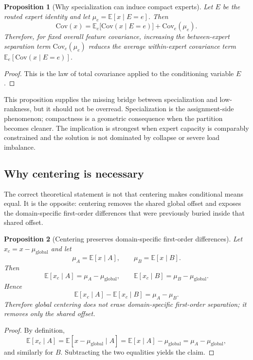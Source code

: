 \documentclass[11pt]{article}
\newtheorem{proposition}{Proposition}
\begin{document}
\begin{proposition}[Why specialization can induce compact experts]
Let $E$ be the routed expert identity and let $\mu_e=\mathbb{E}[x\mid E=e]$. Then
\[
\mathrm{Cov}(x)
=
\mathbb{E}_{e}\!\big[\mathrm{Cov}(x\mid E=e)\big]
+
\mathrm{Cov}_{e}(\mu_e).
\]
Therefore, for fixed overall feature covariance, increasing the between-expert separation term $\mathrm{Cov}_{e}(\mu_e)$ reduces the average within-expert covariance term $\mathbb{E}_{e}[\mathrm{Cov}(x\mid E=e)]$.
\end{proposition}

\begin{proof}
This is the law of total covariance applied to the conditioning variable $E$.
\end{proof}

This proposition supplies the missing bridge between specialization and low-rankness, but it should not be overread. Specialization is the assignment-side phenomenon; compactness is a geometric consequence when the partition becomes cleaner. The implication is strongest when expert capacity is comparably constrained and the solution is not dominated by collapse or severe load imbalance.

\subsection{Why centering is necessary}

The correct theoretical statement is not that centering makes conditional means equal. It is the opposite: centering removes the shared global offset and exposes the domain-specific first-order differences that were previously buried inside that shared offset.

\begin{proposition}[Centering preserves domain-specific first-order differences]
Let $x_c = x - \mu_{\mathrm{global}}$ and let
\[
\mu_A = \mathbb{E}[x\mid A], \qquad \mu_B = \mathbb{E}[x\mid B].
\]
Then
\[
\mathbb{E}[x_c \mid A] = \mu_A - \mu_{\mathrm{global}},
\qquad
\mathbb{E}[x_c \mid B] = \mu_B - \mu_{\mathrm{global}}.
\]
Hence
\[
\mathbb{E}[x_c \mid A] - \mathbb{E}[x_c \mid B] = \mu_A - \mu_B.
\]
Therefore global centering does not erase domain-specific first-order separation; it removes only the shared offset.
\end{proposition}

\begin{proof}
By definition,
\[
\mathbb{E}[x_c \mid A]
=
\mathbb{E}[x-\mu_{\mathrm{global}}\mid A]
=
\mathbb{E}[x\mid A]-\mu_{\mathrm{global}}
=
\mu_A-\mu_{\mathrm{global}},
\]
and similarly for $B$. Subtracting the two equalities yields the claim.
\end{proof}
\end{document}
